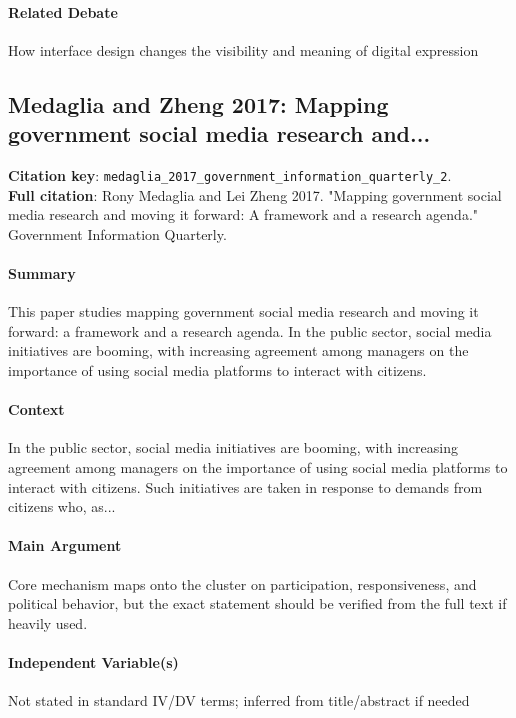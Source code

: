 \documentclass[12pt]{article}
\begin{document}
\paragraph{Related Debate} How interface design changes the visibility and meaning of digital expression


\subsection{Medaglia and Zheng 2017: Mapping government social media research and...}
\textbf{Citation key}: \texttt{medaglia\_2017\_government\_information\_quarterly\_2}.\\
\textbf{Full citation}: Rony Medaglia and Lei Zheng 2017. "Mapping government social media research and moving it forward: A framework and a research agenda." Government Information Quarterly.

\paragraph{Summary} This paper studies mapping government social media research and moving it forward: a framework and a research agenda. In the public sector, social media initiatives are booming, with increasing agreement among managers on the importance of using social media platforms to interact with citizens.

\paragraph{Context} In the public sector, social media initiatives are booming, with increasing agreement among managers on the importance of using social media platforms to interact with citizens. Such initiatives are taken in response to demands from citizens who, as...

\paragraph{Main Argument} Core mechanism maps onto the cluster on participation, responsiveness, and political behavior, but the exact statement should be verified from the full text if heavily used.

\paragraph{Independent Variable(s)} Not stated in standard IV/DV terms; inferred from title/abstract if needed
\end{document}
